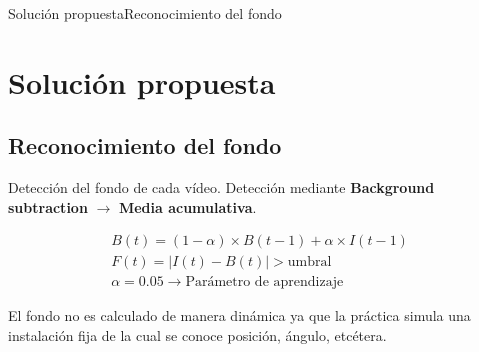 \documentclass{beamer}
\begin{document}
\begin{frame}{Solución propuesta}{Reconocimiento del fondo}
\section{Solución propuesta}
\subsection{Reconocimiento del fondo}

Detección del fondo de cada vídeo. Detección mediante \textbf{Background subtraction} $\rightarrow$ \textbf{Media acumulativa}.

\begin{align*}
	B(t)  = \left(1-\alpha\right) \times B\left(t-1\right) + \alpha \times I\left(t-1\right) \\
	F(t) = \left| I(t) - B(t)\right| > \text{umbral} \\	
	\alpha = 0.05 \rightarrow \text{Parámetro de aprendizaje}
\end{align*}

El fondo no es calculado de manera dinámica ya que la práctica simula una instalación fija de la cual se conoce posición, ángulo, etcétera.
\end{frame}
\end{document}
